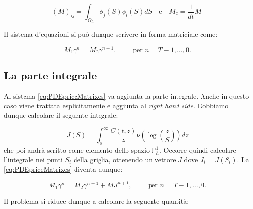 \documentclass[a4paper,10pt]{report}
\theoremstyle{plain}
\theoremstyle{definition}
\theoremstyle{remark}
\begin{document}
\begin{equation*}
(M)_{ij}=\int_{\Omega_h}\phi_j(S)\phi_i(S)dS \quad\text{e}\quad M_2=\frac{1}{dt}M.
\end{equation*}

Il sistema d'equazioni si può dunque scrivere in forma matriciale come:

\begin{equation}
 \label{eq:PDEpriceMatrixes}
 M_1 \gamma^n=M_2\gamma^{n+1}, \qquad \text{ per } n=T-1,\dots,0.
\end{equation}

\subsection{La parte integrale}
Al sistema \eqref{eq:PDEpriceMatrixes} va aggiunta la parte integrale. Anche in questo caso viene trattata esplicitamente e aggiunta al \emph{right hand side}. Dobbiamo dunque calcolare il seguente integrale:

\begin{equation*}
 J(S)=\int_0^\infty \frac{C(t,z)}{z}\nu\left(\log\left(\frac{z}{S}\right) \right)dz
\end{equation*}
che poi andrà scritto come elemento dello spazio $\mathbb{P}_h^1$. Occorre quindi calcolare l'integrale nei punti $S_i$ della griglia, ottenendo un vettore $J$ dove $J_i=J(S_i)$. La \eqref{eq:PDEpriceMatrixes} diventa dunque: 
 
\begin{equation}
 \label{eq:PDEpriceMatrixeswithJ}
 M_1\gamma^n=M_2\gamma^{n+1}+MJ^{n+1}, \qquad \text{ per } n=T-1,\dots,0.
\end{equation}

Il problema si riduce dunque a calcolare la seguente quantità:
\end{document}
